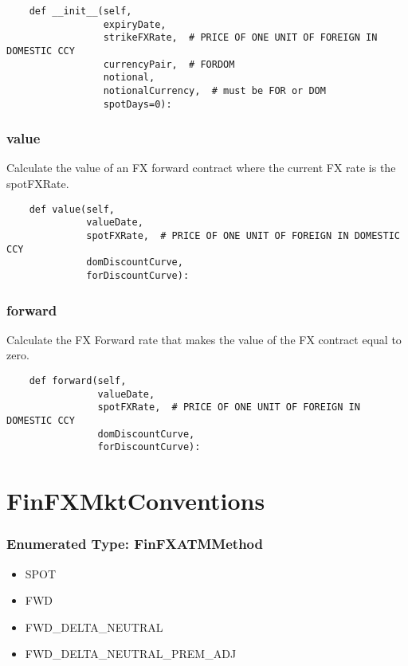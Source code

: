 \documentclass[twoside,11pt]{book}
\begin{document}
\begin{lstlisting}
    def __init__(self,
                 expiryDate,
                 strikeFXRate,  # PRICE OF ONE UNIT OF FOREIGN IN DOMESTIC CCY
                 currencyPair,  # FORDOM
                 notional,
                 notionalCurrency,  # must be FOR or DOM
                 spotDays=0):
\end{lstlisting}

\subsubsection*{{\bf value}}
Calculate the value of an FX forward contract where the current FX rate is the spotFXRate.  

\begin{lstlisting}
    def value(self,
              valueDate,
              spotFXRate,  # PRICE OF ONE UNIT OF FOREIGN IN DOMESTIC CCY
              domDiscountCurve,
              forDiscountCurve):
\end{lstlisting}

\subsubsection*{{\bf forward}}
Calculate the FX Forward rate that makes the value of the FX contract equal to zero.  

\begin{lstlisting}
    def forward(self,
                valueDate,
                spotFXRate,  # PRICE OF ONE UNIT OF FOREIGN IN DOMESTIC CCY
                domDiscountCurve,
                forDiscountCurve):
\end{lstlisting}

\newpage
\section{FinFXMktConventions}

\subsubsection{Enumerated Type: FinFXATMMethod}
\begin{itemize}
\item{SPOT}
\item{FWD}
\item{FWD\_DELTA\_NEUTRAL}
\item{FWD\_DELTA\_NEUTRAL\_PREM\_ADJ}
\end{itemize}
\end{document}

